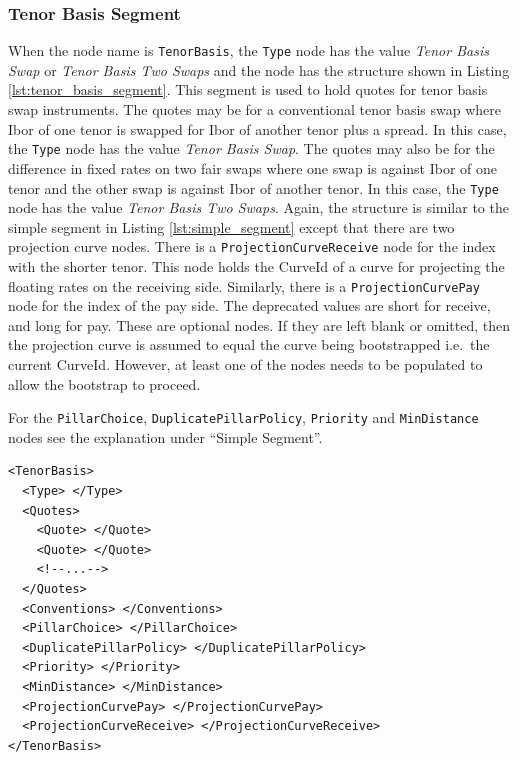 \subsubsection*{Tenor Basis Segment}
When the node name is \lstinline!TenorBasis!, the \lstinline!Type! node has the value \emph{Tenor Basis Swap} or
\emph{Tenor Basis Two Swaps} and the node has the structure shown in Listing \ref{lst:tenor_basis_segment}. This segment
is used to hold quotes for tenor basis swap instruments. The quotes may be for a conventional tenor basis swap where
Ibor of one tenor is swapped for Ibor of another tenor plus a spread. In this case, the \lstinline!Type! node has the
value \emph{Tenor Basis Swap}. The quotes may also be for the difference in fixed rates on two fair swaps where one swap
is against Ibor of one tenor and the other swap is against Ibor of another tenor. In this case, the \lstinline!Type!
node has the value \emph{Tenor Basis Two Swaps}. Again, the structure is similar to the simple segment in Listing
\ref{lst:simple_segment} except that there are two projection curve nodes. There is a \lstinline!ProjectionCurveReceive!
node for the index with the shorter tenor. This node holds the CurveId of a curve for projecting the floating rates on
the receiving side. Similarly, there is a \lstinline!ProjectionCurvePay! node for the index of the pay side. The
deprecated values are short for receive, and long for pay. These are optional nodes. If they are left blank or omitted,
then the projection curve is assumed to equal the curve being bootstrapped i.e.\ the current CurveId. However, at least
one of the nodes needs to be populated to allow the bootstrap to proceed.

For the \lstinline!PillarChoice!, \lstinline!DuplicatePillarPolicy!, \lstinline!Priority! and \lstinline!MinDistance!
nodes see the explanation under ``Simple Segment''.

\begin{listing}[H]
\begin{verbatim}
<TenorBasis>
  <Type> </Type>
  <Quotes>
    <Quote> </Quote>
    <Quote> </Quote>
    <!--...-->
  </Quotes>
  <Conventions> </Conventions>
  <PillarChoice> </PillarChoice>
  <DuplicatePillarPolicy> </DuplicatePillarPolicy>
  <Priority> </Priority>
  <MinDistance> </MinDistance>
  <ProjectionCurvePay> </ProjectionCurvePay>
  <ProjectionCurveReceive> </ProjectionCurveReceive>
</TenorBasis>
\end{verbatim}
\caption{Tenor basis yield curve segment}
\label{lst:tenor_basis_segment}
\end{listing}

